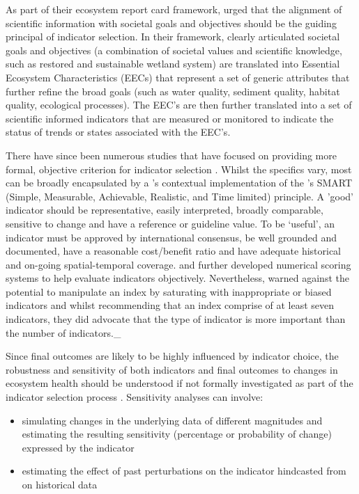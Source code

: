 As part of their ecosystem report card framework, \citet{Harwell-1999} urged that the alignment of
scientific information with societal goals and objectives should be the guiding principal of
indicator selection.  In their framework, clearly articulated societal goals and objectives (a
combination of societal values and scientific knowledge, such as restored and sustainable wetland
system) are translated into Essential Ecosystem Characteristics (EECs) that represent a set of
generic attributes that further refine the broad goals (such as water quality, sediment quality,
habitat quality, ecological processes).  The EEC's are then further translated into a set of
scientific informed indicators that are measured or monitored to indicate the status of trends or
states associated with the EEC's.
  
There have since been numerous studies that have focused on providing more formal, objective
criterion for indicator selection \citep{Dauvin-2008, Emerson-2012, Flint-2012, James-2012}.  Whilst
the specifics vary, most can be broadly encapsulated by a \citet{Dauvin-2008}'s contextual
implementation of the \citet{Doran-1981}'s SMART (Simple, Measurable, Achievable, Realistic, and
Time limited) principle.  A 'good' indicator should be representative, easily interpreted, broadly
comparable, sensitive to change and have a reference or guideline value.  To be `useful', an
indicator must be approved by international consensus, be well grounded and documented, have a
reasonable cost/benefit ratio and have adequate historical and on-going spatial-temporal coverage.
\citet{Flint-2012} and \citet{James-2012} further developed numerical scoring systems to help
evaluate indicators objectively.  Nevertheless, \citep{Neary-2012} warned against the potential to
manipulate an index by saturating with inappropriate or biased indicators and whilst recommending
that an index comprise of at least seven indicators, they did advocate that the type of indicator is
more important than the number of indicators._

Since final outcomes are likely to be highly influenced by indicator choice, the robustness and
sensitivity of both indicators and final outcomes to changes in ecosystem health should be
understood if not formally investigated as part of the indicator selection process
\citep{Dobbie-2013}.  Sensitivity analyses can involve:

\begin{itemize}
\item simulating changes in the underlying data of different magnitudes and estimating the resulting
sensitivity (percentage or probability of change) expressed by the indicator
\item estimating the effect of past perturbations on the indicator hindcasted from on historical
data
\end{itemize}

